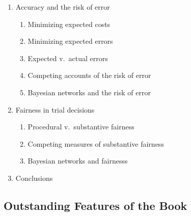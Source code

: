 \documentclass[
  10pt,
  dvipsnames,enabledeprecatedfontcommands]{scrartcl}
\begin{document}
\begin{enumerate}
\begin{enumerate}
  \item  Accuracy and the risk of error
  \begin{enumerate}
  \item  Minimizing expected costs
  \item  Minimizing expected errors
  \item  Expected v.\ actual errors
  \item  Competing accounts of the risk of error
  \item  Bayesian networks and the risk of error
  \end{enumerate}



  \item  Fairness in trial decisions
  \begin{enumerate}
  \item  Procedural v.\ substantive fairness
  \item  Competing measures of substantive fairness
  \item  Bayesian networks and fairnesss
  \end{enumerate}


 

\item Conclusions
\end{enumerate}
\end{enumerate}

\hypertarget{outstanding-features-of-the-book}{%
\subsection{Outstanding Features of the
Book}\label{outstanding-features-of-the-book}}
\end{document}
